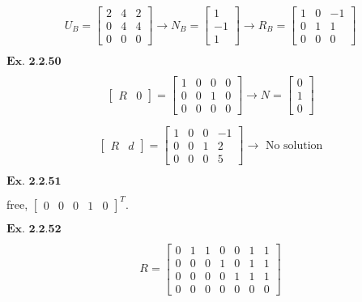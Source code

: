\documentclass{article}
\begin{document}
$$
U_B = \begin{bmatrix}2&4&2\\0&4&4\\0&0&0\end{bmatrix} \rightarrow N_B = \begin{bmatrix}1\\-1\\1\end{bmatrix} \rightarrow R_B = \begin{bmatrix}1&0&-1\\0&1&1\\0&0&0\end{bmatrix}
$$


\vspace{0.2in}
${\textbf{Ex. 2.2.50}}$

$$
\begin{bmatrix}R&0\end{bmatrix} = \begin{bmatrix}1&0&0&0\\0&0&1&0\\0&0&0&0\end{bmatrix} \rightarrow N = \begin{bmatrix}0\\1\\0\end{bmatrix}
$$


$$
\begin{bmatrix}R&d\end{bmatrix} = \begin{bmatrix}1&0&0&-1\\0&0&1&2\\0&0&0&5\end{bmatrix} \rightarrow \text{ No solution}
$$

\vspace{0.2in}
${\textbf{Ex. 2.2.51}}$

free, $\begin{bmatrix}0&0&0&1&0\end{bmatrix}^T$.

\vspace{0.2in}
${\textbf{Ex. 2.2.52}}$

$$
R = \begin{bmatrix}0&1&1&0&0&1&1\\0&0&0&1&0&1&1\\0&0&0&0&1&1&1\\0&0&0&0&0&0&0\end{bmatrix}
$$
\end{document}

